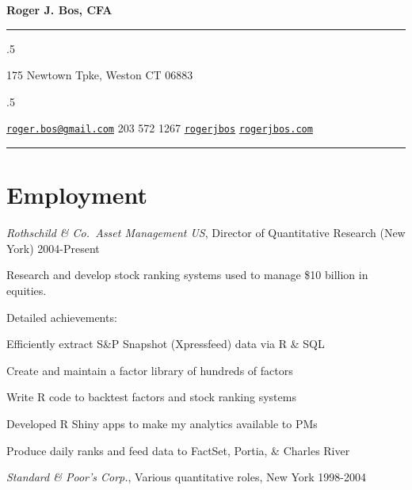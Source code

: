 \documentclass[11pt,]{article}
\renewenvironment{itemize}{
  \begin{list}{}{
    \setlength{\leftmargin}{1.5em}
  }
}{
  \end{list}
}
\begin{document}
\centerline{\huge \bf Roger J. Bos, CFA}

\vspace{2 mm}

\hrule

\vspace{2 mm}


\moveleft.5\hoffset\centerline{175 Newtown Tpke, Weston CT 06883}
\moveleft.5\hoffset\centerline{ \faEnvelopeO \hspace{1 mm} \href{mailto:}{\tt \href{mailto:roger.bos@gmail.com}{\nolinkurl{roger.bos@gmail.com}}} \hspace{1 mm}  \faPhone \hspace{1 mm}  203 572 1267  \hspace{1 mm}  \faGithub \hspace{1 mm} \href{http://github.com/rogerjbos}{\tt rogerjbos} \hspace{1 mm}    \faGlobe \hspace{1 mm} \href{http://rogerjbos.com}{\tt rogerjbos.com}   }

\vspace{2 mm}

\hrule


\hypertarget{employment}{%
\section{Employment}\label{employment}}

\emph{Rothschild \& Co.~Asset Management US}, Director of Quantitative
Research (New York) \hfill 2004-Present

Research and develop stock ranking systems used to manage \$10 billion
in equities.

Detailed achievements:

\begin{itemize}
\item
  Efficiently extract S\&P Snapshot (Xpressfeed) data via R \& SQL
\item
  Create and maintain a factor library of hundreds of factors
\item
  Write R code to backtest factors and stock ranking systems
\item
  Developed R Shiny apps to make my analytics available to PMs
\item
  Produce daily ranks and feed data to FactSet, Portia, \& Charles River
\end{itemize}

\emph{Standard \& Poor's Corp.}, Various quantitative roles, New York
\hfill 1998-2004
\end{document}
